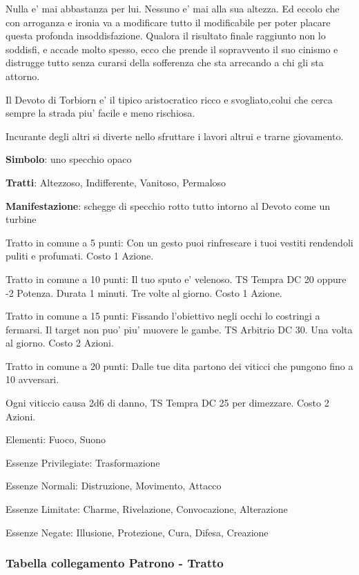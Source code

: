 \documentclass[a4paper,11pt,twoside,openany]{dndbook}
\begin{document}
{Nulla e' mai abbastanza per lui. Nessuno e' mai alla sua altezza. Ed eccolo che con arroganza e ironia va a modificare tutto il modificabile per poter placare questa profonda insoddisfazione. Qualora il risultato finale raggiunto non lo soddisfi, e accade molto spesso, ecco che prende il sopravvento il suo cinismo e distrugge tutto senza curarsi della sofferenza che sta arrecando a chi gli sta attorno.

Il Devoto di Torbiorn e' il tipico aristocratico ricco e svogliato,colui che cerca sempre la strada piu' facile e meno rischiosa.

Incurante degli altri si diverte nello sfruttare i lavori altrui e trarne giovamento.

\textbf{Simbolo}: uno specchio opaco

\textbf{Tratti}: Altezzoso, Indifferente, Vanitoso, Permaloso

\textbf{Manifestazione}: schegge di specchio rotto tutto intorno al Devoto come un turbine

\bigskip

Tratto in comune a 5 punti: Con un gesto puoi rinfrescare i tuoi vestiti rendendoli puliti e profumati. Costo 1 Azione.

Tratto in comune a 10 punti: Il tuo sputo e' velenoso. TS Tempra DC 20 oppure -2 Potenza. Durata 1 minuti. Tre volte al giorno. Costo 1 Azione.

Tratto in comune a 15 punti: Fissando l'obiettivo negli occhi lo costringi a fermarsi. Il target non puo' piu' muovere le gambe. TS Arbitrio DC 30. Una volta al giorno. Costo 2 Azioni.

Tratto in comune a 20 punti: Dalle tue dita partono dei viticci che pungono fino a 10 avversari.

Ogni viticcio causa 2d6 di danno, TS Tempra DC 25 per dimezzare. Costo 2 Azioni.

\bigskip

Elementi: Fuoco, Suono

\bigskip

Essenze Privilegiate: Trasformazione

Essenze Normali: Distruzione, Movimento, Attacco

Essenze Limitate: Charme, Rivelazione, Convocazione, Alterazione

Essenze Negate: Illusione, Protezione, Cura, Difesa, Creazione

\subsubsection{Tabella collegamento Patrono - Tratto}

}
\end{document}
